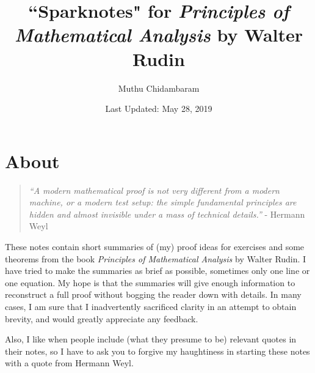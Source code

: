 \documentclass{article}
\begin{document}
\title{``Sparknotes" for \textit{Principles of Mathematical Analysis} by Walter Rudin}
\author{Muthu Chidambaram}
\date{Last Updated: May 28, 2019} 

\maketitle

\tableofcontents
\newpage 

\section*{About}

\begin{quote}
        \textit{``A modern mathematical proof is not very different from a modern machine,
or a modern test setup: the simple fundamental principles are hidden 
and almost invisible under a mass of technical details.''} - Hermann Weyl
\end{quote}

These notes contain short summaries of (my) proof ideas for exercises
and some theorems from the book \textit{Principles of Mathematical Analysis} by Walter Rudin.
I have tried to make the summaries as brief as possible, sometimes only one line or one equation.
My hope is that the summaries will give enough information to reconstruct a full proof without bogging the reader down with details. 
In many cases, I am sure that I inadvertently sacrificed clarity in an attempt to obtain brevity, and would greatly appreciate any feedback.

Also, I like when people include (what they presume to be) relevant quotes in their notes, so I have to ask you to forgive my haughtiness in starting these notes with a quote from Hermann Weyl.




\end{document}
